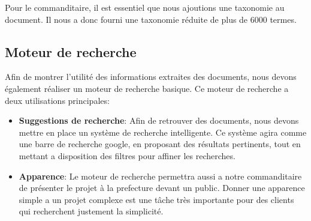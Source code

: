 Pour le commanditaire, il est essentiel que nous ajoutions une taxonomie au document.
Il nous a donc fourni une taxonomie réduite de plus de 6000 termes.


\subsection{Moteur de recherche}
Afin de montrer l'utilité des informations extraites des documents, nous devons également réaliser un moteur de recherche basique.
Ce moteur de recherche a deux utilisations principales: 
\begin{itemize}
\item \textbf{Suggestions de recherche}:\newline
Afin de retrouver des documents, nous devons mettre en place un système de recherche intelligente.
Ce système agira comme une barre de recherche google, en proposant des résultats pertinents, tout en mettant a disposition des filtres pour affiner les recherches.

\item \textbf{Apparence}:\newline
Le moteur de recherche permettra aussi a notre commanditaire de présenter le projet à la prefecture devant un public.
Donner une apparence simple a un projet complexe est une tâche très importante pour des clients qui recherchent justement la simplicité.
\end{itemize}

